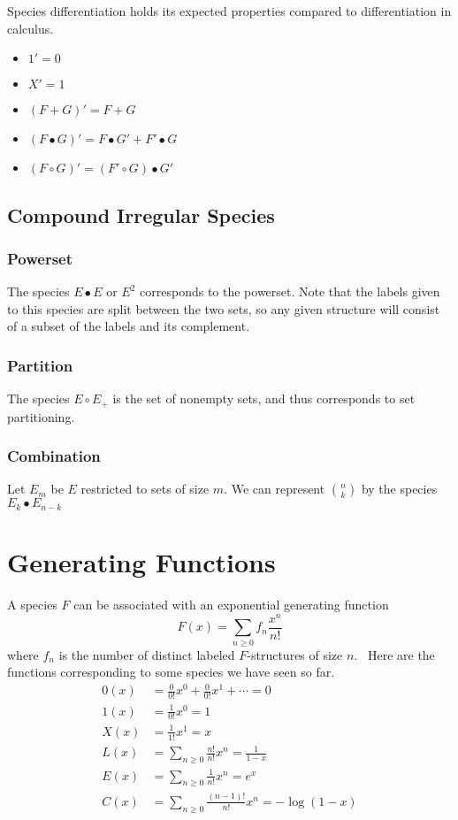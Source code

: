 \documentclass{article}
\begin{document}
Species differentiation holds its expected properties compared to differentiation in calculus.
\begin{itemize}
  \item \( 1' = 0 \)
  \item \( X' = 1 \)
  \item \( (F + G)' = F + G \)
  \item \( (F \bullet G)' = F \bullet G' + F' \bullet G \)
  \item \( (F \circ G)' = (F' \circ G) \bullet G' \)
\end{itemize}

\subsection{Compound Irregular Species}
\subsubsection*{Powerset}
The species \( E \bullet E \) or \( E^2 \) corresponds to the powerset. Note that the labels given
to this species are split between the two sets, so any given structure will consist of a subset of
the labels and its complement.

\subsubsection*{Partition}
The species \( E \circ E_+ \) is the set of nonempty sets, and thus corresponds to set partitioning.

\subsubsection*{Combination}
Let \( E_m \) be \( E \) restricted to sets of size \( m \). We can represent \( \binom{n}{k} \) by
the species \( E_k \bullet E_{n-k} \)


\section{Generating Functions}
A species \( F \) can be associated with an exponential generating function
\[
  F(x) = \sum_{n \geq 0} f_n \frac{x^n}{n!}
\]
where \( f_n \) is the number of distinct labeled \( F \)-structures of size \( n \).~\cite{yorgey}
Here are the functions corresponding to some species we have seen so far.
{\setlength{\jot}{\baselineskip}
  \begin{align*}
    0(x) & = \frac{0}{0!} x^0 + \frac{0}{0!} x^1 + \cdots = 0               \\
    1(x) & = \frac{1}{0!} x^0                             = 1               \\
    X(x) & = \frac{1}{1!} x^1                             = x               \\
    L(x) & = \sum_{n \geq 0} \frac{n!}{n!} x^n            = \frac{1}{1 - x} \\
    E(x) & = \sum_{n \geq 0} \frac{1}{n!} x^n             = e^x             \\
    C(x) & = \sum_{n \geq 0} \frac{(n - 1)!}{n!} x^n      = -\log{(1 - x)}
  \end{align*}
}
\end{document}
